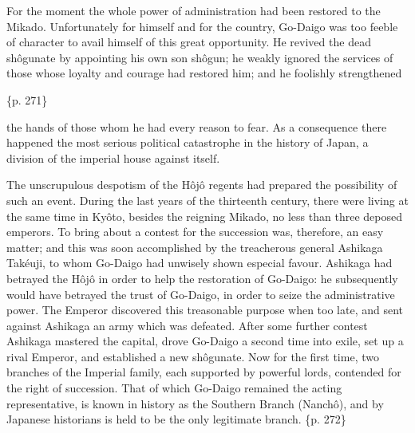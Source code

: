 For the moment the whole power of administration had been restored to the Mikado. Unfortunately for himself and for the country, Go-Daigo was too feeble of character to avail himself of this great opportunity. He revived the dead shôgunate by appointing his own son shôgun; he weakly ignored the services of those whose loyalty and courage had restored him; and he foolishly strengthened

\{p. 271\}

the hands of those whom he had every reason to fear. As a consequence there happened the most serious political catastrophe in the history of Japan, a division of the imperial house against itself.

The unscrupulous despotism of the Hôjô regents had prepared the possibility of such an event. During the last years of the thirteenth century, there were living at the same time in Kyôto, besides the reigning Mikado, no less than three deposed emperors. To bring about a contest for the succession was, therefore, an easy matter; and this was soon accomplished by the treacherous general Ashikaga Takéuji, to whom Go-Daigo had unwisely shown especial favour. Ashikaga had betrayed the Hôjô in order to help the restoration of Go-Daigo: he subsequently would have betrayed the trust of Go-Daigo, in order to seize the administrative power. The Emperor discovered this treasonable purpose when too late, and sent against Ashikaga an army which was defeated. After some further contest Ashikaga mastered the capital, drove Go-Daigo a second time into exile, set up a rival Emperor, and established a new shôgunate. Now for the first time, two branches of the Imperial family, each supported by powerful lords, contended for the right of succession. That of which Go-Daigo remained the acting representative, is known in history as the Southern Branch (Nanchô), and by Japanese historians is held to be the only legitimate branch. \{p. 272\}

